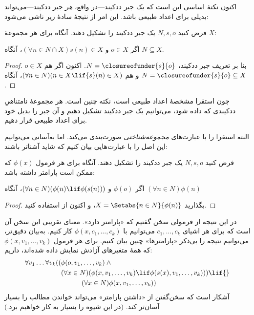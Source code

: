 \documentclass[../../../include/open-logic-section]{subfiles}
\begin{document}

اکنون نکتهٔ اساسی این است که یک جبر ددکیند---در واقع، \emph{هر} جبر
ددکیند---می‌تواند بدیلی برای اعداد طبیعی باشد. این امر از نتیجهٔ سادهٔ زیر
ناشی می‌شود:

\begin{thm}
فرض کنید $N, s, o$ یک جبر ددکیند را تشکیل دهند. آنگاه برای هر مجموعهٔ
$X$:
	\begin{center}
		اگر $o \in X$ و $(\forall {n} \in N \cap X){s}({n}) \in X$، {آنگاه} $N \subseteq X$.
	\end{center}
\end{thm}

\begin{proof}
بنا بر تعریف جبر ددکیند، $N = \closureofunder{s}{o}$. اکنون اگر هم
${o} \in X$ و هم $(\forall {n} \in N)(n \in X \lif
{s}({n}) \in X)$، آنگاه $N = \closureofunder{s}{o} \subseteq X$.
\end{proof}

چون استقرا مشخصهٔ اعداد طبیعی است، نکته چنین است. هر مجموعهٔ نامتناهیِ
ددکیندی که داده شود، می‌توانیم یک جبر ددکیند تشکیل دهیم و آن جبر را بدیل
خود برای اعداد طبیعی قرار دهیم.

البته  استقرا را با عبارت‌های
\emph{مجموعه‌شناختی} صورت‌بندی می‌کند. اما به‌آسانی می‌توانیم این اصل را
با عبارت‌هایی بیان کنیم که شاید آشناتر باشند:

\begin{cor}
فرض کنید $N, s, o$ یک جبر ددکیند را تشکیل دهند. آنگاه برای هر فرمول
$\phi(x)$ که ممکن است پارامتر داشته باشد:
\begin{center}
	اگر $\phi(o)$ و $(\forall {n} \in N)(\phi(n)\lif
	\phi({s}({n})))$، {آنگاه} $(\forall n \in N)\phi(n)$
\end{center}
\end{cor}

\begin{proof}
بگذارید $X = \Setabs{n \in N}{\phi(n)}$، و اکنون از
 استفاده کنید.
\end{proof}

در این نتیجه از فرمولی سخن گفتیم که «پارامتر دارد». معنای تقریبی این سخن
آن است که برای هر اشیای $c_1, \ldots, c_k$ می‌توانیم با
$\phi(x, c_1, \ldots, c_k)$ کار کنیم. به‌بیان دقیق‌تر، می‌توانیم نتیجه را
بی‌ذکر «پارامترها» چنین بیان کنیم. برای هر فرمول
$\phi(x, v_1, \ldots, v_k)$ که همهٔ متغیرهای آزادش نمایش داده شده‌اند،
داریم:
	\begin{align*}
			\forall v_1 \ldots \forall v_k((&\phi(o, v_1,\ldots, v_k) \land {}\\
			&	(\forall x \in N)(\phi(x,v_1, \ldots, v_k) \lif \phi(s(x), v_1,\ldots, v_k))) \lif {}\\
			&\hspace{3em} (\forall x \in N)\phi(x, v_1,\ldots, v_k))
	\end{align*}
آشکار است که سخن‌گفتن از «داشتن پارامتر» می‌تواند خواندن مطالب را بسیار
آسان‌تر کند. (در  این شیوه را بسیار به کار خواهیم
برد.)
\end{document}
